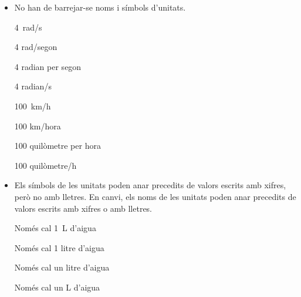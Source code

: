 \begin{itemize}
\textcolor{Green}\faCheckSquare{} \qty{150}{kg}

\textcolor{Red}\faTimesCircle{} \qty{150}{kgs}

\textcolor{Green}\faCheckSquare{} \qty{25}{m}

\textcolor{Red}\faTimesCircle{} \qty{25}{mts}

\textcolor{Green}\faCheckSquare{} \qty{33}{cm^3}

\textcolor{Red}\faTimesCircle{} \qty{33}{cc}

\textcolor{Green}\faCheckSquare{} \qty{20}{s}

\textcolor{Red}\faTimesCircle{} \qty{20}{seg}

\textcolor{Green}\faCheckSquare{} \qty{80}{km/h}

\textcolor{Red}\faTimesCircle{} \qty{80}{kph}

\textcolor{Green}\faCheckSquare{} \qty{1500}{r/min}

\textcolor{Red}\faTimesCircle{} \qty{1500}{rpm}
	

\item No han de barrejar-se noms i símbols d'unitats.

\textcolor{Green}\faCheckSquare{} \qty{4}{rad/s}

\textcolor{Red}\faTimesCircle{} 4 rad/segon

\textcolor{Green}\faCheckSquare{} 4 radian per segon

\textcolor{Red}\faTimesCircle{} 4 radian/s

\textcolor{Green}\faCheckSquare{} \qty{100}{km/h}

\textcolor{Red}\faTimesCircle{} 100 km/hora

\textcolor{Green}\faCheckSquare{} 100 quilòmetre per hora

\textcolor{Red}\faTimesCircle{} 100 quilòmetre/h


\item Els símbols de les unitats  poden anar precedits de valors escrits amb xifres, però no amb lletres. En canvi, els noms de les unitats poden anar precedits de valors escrits amb xifres o amb lletres. 

\textcolor{Green}\faCheckSquare{} Només cal \qty{1}{L} d'aigua

\textcolor{Green}\faCheckSquare{} Només cal 1 litre d'aigua

\textcolor{Green}\faCheckSquare{} Només cal un litre d'aigua

\textcolor{Red}\faTimesCircle{} Només cal un L d'aigua



\end{itemize}
